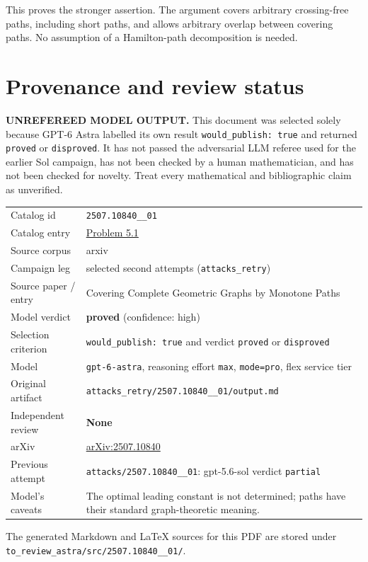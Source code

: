 \documentclass[
  11pt,
  a4paper,
]{article}
\newcounter{none} %
\begin{document}
This proves the stronger assertion. The argument covers arbitrary
crossing-free paths, including short paths, and allows arbitrary overlap
between covering paths. No assumption of a Hamilton-path decomposition
is needed.

\appendix

\section{Provenance and review
status}\label{provenance-and-review-status}

\begin{warning}

\textbf{UNREFEREED MODEL OUTPUT.} This document was selected solely
because GPT-6 Astra labelled its own result
\texttt{would\_publish:\ true} and returned \texttt{proved} or
\texttt{disproved}. It has not passed the adversarial LLM referee used
for the earlier Sol campaign, has not been checked by a human
mathematician, and has not been checked for novelty. Treat every
mathematical and bibliographic claim as unverified.

\end{warning}

{\def\LTcaptype{none} %
\begin{longtable}[]{@{}
  >{\raggedright\arraybackslash}p{}
  >{\raggedright\arraybackslash}p{}@{}}
\toprule\noalign{}
\endhead
\bottomrule\noalign{}
\endlastfoot
Catalog id & \texttt{2507.10840\_\_01} \\
Catalog entry &
\href{https://graph-theory-ai.github.io/graph-conjectures/arxiv/2507.10840__01/}{Problem
5.1} \\
Source corpus & arxiv \\
Campaign leg & selected second attempts (\texttt{attacks\_retry}) \\
Source paper / entry & Covering Complete Geometric Graphs by Monotone
Paths \\
Model verdict & \textbf{proved} (confidence: high) \\
Selection criterion & \texttt{would\_publish:\ true} and verdict
\texttt{proved} or \texttt{disproved} \\
Model & \texttt{gpt-6-astra}, reasoning effort \texttt{max},
\texttt{mode=pro}, flex service tier \\
Original artifact &
\texttt{attacks\_retry/2507.10840\_\_01/output.md} \\
Independent review & \textbf{None} \\
arXiv & \href{https://arxiv.org/abs/2507.10840}{arXiv:2507.10840} \\
Previous attempt & \texttt{attacks/2507.10840\_\_01}: gpt-5.6-sol
verdict \texttt{partial} \\
Model's caveats & The optimal leading constant is not determined; paths
have their standard graph-theoretic meaning. \\
\end{longtable}
}

The generated Markdown and LaTeX sources for this PDF are stored under
\texttt{to\_review\_astra/src/2507.10840\_\_01/}.
\end{document}
